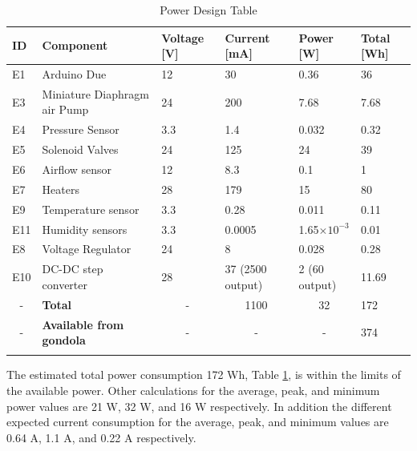 \documentclass[a4paper,12pt,twoside]{article}
\providecommand{\DIFaddtex}[1]{{\protect\color{blue}\uwave{#1}}} %
\providecommand{\DIFaddbegin}{} %
\providecommand{\DIFaddend}{} %
\providecommand{\DIFadd}[1]{\texorpdfstring{\DIFaddtex{#1}}{#1}} %
\newcommand{\DIFaddincludegraphics}[2][]{{\color{blue}\fbox{\DIFOincludegraphics[#1]{#2}}}} %
\DeclareRobustCommand{\DIFaddbegin}{\DIFOaddbegin \let\includegraphics\DIFaddincludegraphics} %
\DeclareRobustCommand{\DIFaddend}{\DIFOaddend \let\includegraphics\DIFOincludegraphics} %
\begin{document}
\begin{longtable}{|m{}| m{} |m{} |m{}|m{}| m{} |}
\hline
\textbf{ID}             & \textbf{Component}                                                   & \textbf{Voltage {[}V{]}} & \textbf{Current {[}mA{]}} & \textbf{Power {[}W{]}} & \textbf{Total {[}Wh{]}} \\ \hline
E1 & Arduino Due & 12& 30  & 0.36  & 36  \\ \hline
E3 & Miniature Diaphragm air Pump & 24 & 200 & 7.68 & 7.68 \\ \hline
E4  & Pressure Sensor  & 3.3 & 1.4 & 0.032 & 0.32  \\ \hline
E5  & Solenoid Valves & 24 & 125 & 24  & 39 \\ \hline
E6 & Airflow sensor & 12  & 8.3   & 0.1 & 1 \\ \hline

E7   &  Heaters & 28 & 179  & 15 & 80 \\ \hline
E9  & Temperature sensor & 3.3 & 0.28 & 0.011  & 0.11   \\ \hline

E11 & Humidity sensors & 3.3  & 0.0005   & 1.65$\times10^{-3}$  & 0.01 \\
\hline
E8  & Voltage Regulator   & 24   & 8 & 0.028 & 0.28 \\ \hline


E10  & DC-DC step converter   & 28   & 37 (2500 output) & 2 (60 output) & 11.69 \\ \hline
\multicolumn{1}{|c|}{-} & \textbf{Total}                                  & \multicolumn{1}{c|}{-}                      & \multicolumn{1}{c|}{1100}                    & \multicolumn{1}{c|}{32}                 & 172                                        \\ \hline
\multicolumn{1}{|c|}{-} & \textbf{Available from gondola}                 & \multicolumn{1}{c|}{-}                      & \multicolumn{1}{c|}{-}                       & \multicolumn{1}{c|}{-}                    & 374                                        \\ \hline

\caption{Power Design Table\DIFaddbegin \DIFadd{.}\DIFaddend }
\label{tab:power-design-table}
\end{longtable}
\raggedbottom



The estimated total power consumption 172 Wh, Table \ref{tab:power-design-table}, is within the limits of the available power. Other calculations for the average, peak, and minimum power values are 21 W, 32 W, and 16 W respectively. In addition the different expected current consumption for the average, peak, and minimum values are 0.64 A, 1.1 A, and 0.22 A respectively.
\end{document}
